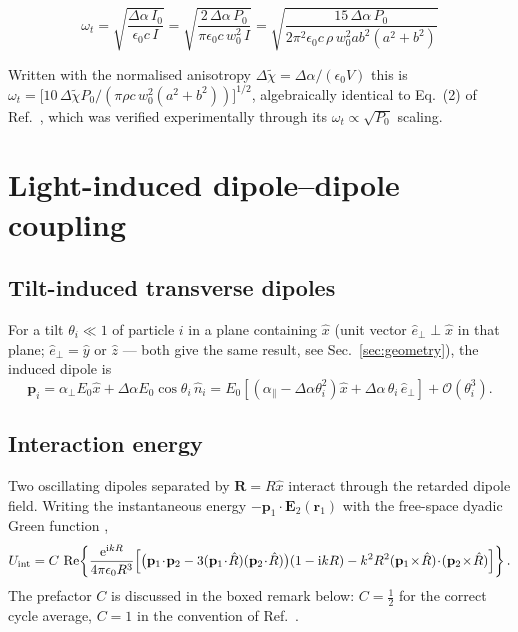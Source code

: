 \documentclass[11pt,a4paper]{article}
\newcommand{\dalpha}{\Delta\alpha}
\newcommand{\ee}{\mathrm{e}}
\newcommand{\ii}{\mathrm{i}}
\begin{document}
\begin{tcolorbox}[colback=blue!4,colframe=blue!45!black,title=Result 1:
librational frequency]
\begin{equation}
  \boxed{\;
  \omega_t=\sqrt{\frac{\dalpha\,I_0}{\epsilon_0 c\,I}}
         =\sqrt{\frac{2\,\dalpha\,P_0}{\pi\epsilon_0 c\,w_0^{2}\,I}}
         =\sqrt{\frac{15\,\dalpha\,P_0}
                     {2\pi^{2}\epsilon_0c\,\rho\,w_0^{2}ab^{2}(a^{2}+b^{2})}}\;}
  \label{eq:omegat}
\end{equation}
\end{tcolorbox}

\noindent
Written with the normalised anisotropy
$\Delta\tilde\chi=\dalpha/(\epsilon_0V)$ this is
$\omega_t=\bigl[10\,\Delta\tilde\chi P_0/(\pi\rho c\,w_0^{2}(a^{2}+b^{2}))\bigr]^{1/2}$,
algebraically identical to Eq.~(2) of Ref.~\cite{Hoang2016}, which was verified
experimentally through its $\omega_t\propto\sqrt{P_0}$ scaling.

\section{Light-induced dipole--dipole coupling}

\subsection{Tilt-induced transverse dipoles}

For a tilt $\theta_i\ll1$ of particle $i$ in a plane containing $\hat x$ (unit
vector $\hat e_{\perp}\perp\hat x$ in that plane; $\hat e_\perp=\hat y$ or
$\hat z$ --- both give the same result, see Sec.~\ref{sec:geometry}), the induced
dipole is
\begin{equation}
  \mathbf p_i=\alpha_{\perp}E_0\hat x+\dalpha E_0\cos\theta_i\,\hat n_i
  =E_0\left[\left(\alpha_{\parallel}-\dalpha\theta_i^{2}\right)\hat x
  +\dalpha\,\theta_i\,\hat e_{\perp}\right]+\mathcal O(\theta_i^{3}).
  \label{eq:pi}
\end{equation}

\subsection{Interaction energy}

Two oscillating dipoles separated by $\mathbf R=R\hat x$ interact through the
retarded dipole field.  Writing the instantaneous energy $-\mathbf p_1\cdot
\mathbf E_2(\mathbf r_1)$ with the free-space dyadic Green function
\cite{Dholakia2010,Rieser2022,Rudolph2024},
\begin{equation}
  U_{\rm int}=C\,\operatorname{Re}\!\left\{
  \frac{\ee^{\ii kR}}{4\pi\epsilon_0R^{3}}
  \Bigl[\bigl(\mathbf p_1\!\cdot\!\mathbf p_2
        -3(\mathbf p_1\!\cdot\!\hat R)(\mathbf p_2\!\cdot\!\hat R)\bigr)
        (1-\ii kR)
        -k^{2}R^{2}(\mathbf p_1\!\times\!\hat R)\!\cdot\!
                   (\mathbf p_2\!\times\!\hat R)\Bigr]\right\}.
  \label{eq:Uint}
\end{equation}
The prefactor $C$ is discussed in the boxed remark below: $C=\tfrac12$ for the
correct cycle average, $C=1$ in the convention of Ref.~\cite{Zhang2025}.
\end{document}
